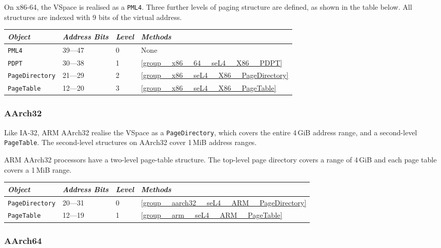 On x86-64, the VSpace is realised as a \texttt{PML4}. Three further levels of paging structure are
defined, as shown in the table below. All structures are indexed with 9 bits of the virtual
address.

\begin{tabularx}{\textwidth}{Xlll} \toprule
\emph{Object}          & \emph{Address Bits} & \emph{Level} & \emph{Methods} \\ \midrule
\texttt{PML4}          & 39---47             & 0            & None \\
\texttt{PDPT}          & 30---38             & 1            & \autoref{group__x86__64__seL4__X86__PDPT} \\
\texttt{PageDirectory} & 21---29             & 2            & \autoref{group__x86__seL4__X86__PageDirectory} \\
\texttt{PageTable}     & 12---20             & 3            & \autoref{group__x86__seL4__X86__PageTable} \\
\bottomrule
\end{tabularx}

\subsubsection{AArch32}

Like IA-32, ARM AArch32 realise the VSpace as a \texttt{PageDirectory}, which covers the entire
4\,GiB address range, and a second-level \texttt{PageTable}. The second-level structures on AArch32
cover 1\,MiB address ranges.

ARM AArch32 processors have a two-level page-table structure.
The top-level page directory covers a range of 4\,GiB and each page table covers a 1\,MiB range.

\begin{tabularx}{\textwidth}{Xlll} \toprule
\emph{Object}          & \emph{Address Bits} & \emph{Level} & \emph{Methods} \\ \midrule
\texttt{PageDirectory} & 20---31             & 0            & \autoref{group__aarch32__seL4__ARM__PageDirectory} \\
\texttt{PageTable}     & 12---19             & 1            & \autoref{group__arm__seL4__ARM__PageTable} \\
\bottomrule
\end{tabularx}

\subsubsection{AArch64}

